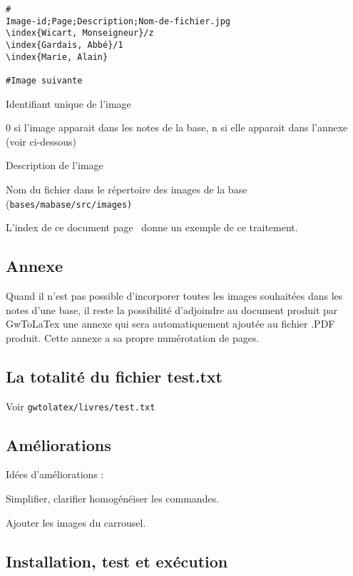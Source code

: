 \begin{verbatim}
#
Image-id;Page;Description;Nom-de-fichier.jpg
\index{Wicart, Monseigneur}/z
\index{Gardais, Abbé}/1
\index{Marie, Alain}

#Image suivante
\end{verbatim}
\begin{description}[style=nextline]
\item[Image-id] Identifiant unique de l'image
\item[Page] 0 si l'image apparait dans les notes de la base, n si elle apparait
dans l'annexe (voir ci-dessous) 
\item[Description] Description de l'image
\item[Nom-de-fichier] Nom du fichier dans le répertoire des images de la base
(\tt{bases/mabase/src/images})
\end{description}

L'index de ce document page~\pageref{index} donne un exemple de ce traitement.

\subsection{Annexe}
\label{annexe}
Quand il n'est pas possible d'incorporer toutes les images souhaitées dans les
notes d'une base, il reste la possibilité d'adjoindre au document produit par 
GwToLaTex une annexe qui sera automatiquement ajoutée au fichier .PDF produit.
Cette annexe a sa propre numérotation de pages.

\subsection{La totalité du fichier test.txt}

Voir \verb|gwtolatex/livres/test.txt|

\subsection{Améliorations}

Idées d'améliorations :
\begin{description}
\item Simplifier, clarifier homogénéiser les commandes.
\item Ajouter les images du carrousel.
\end{description}

\subsection{Installation, test et exécution}

